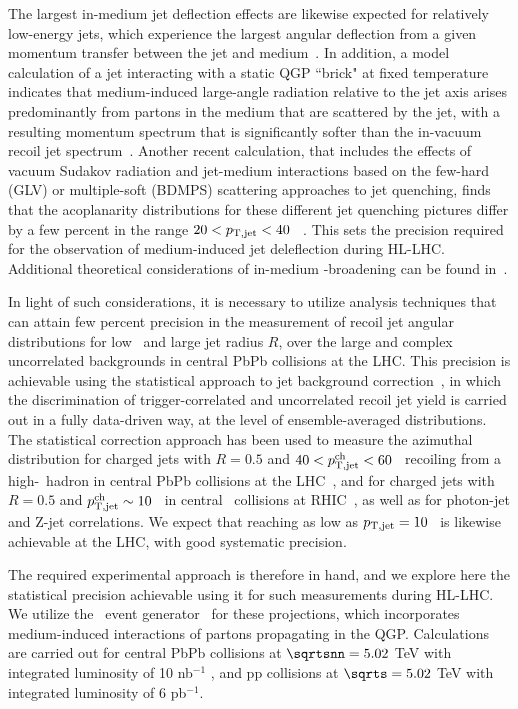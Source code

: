 The largest in-medium jet deflection effects are likewise expected for relatively low-energy jets, which experience the largest angular deflection from a given momentum transfer between the jet and medium~\cite{DEramo:2018eoy,Gyulassy:2018qhr}. In addition, a model calculation of a jet interacting with a static QGP ``brick" at fixed temperature indicates that medium-induced large-angle radiation relative to the jet axis arises predominantly from partons in the medium that are scattered by the jet, with a resulting momentum spectrum that is significantly softer than the in-vacuum recoil jet spectrum~\cite{DEramo:2018eoy}. Another recent calculation, that includes the effects of vacuum Sudakov radiation and jet-medium interactions based on the few-hard (GLV) or multiple-soft (BDMPS) scattering approaches to jet quenching, finds that the acoplanarity distributions for these different jet quenching pictures differ by a few percent in the range $20<p_{\mathrm{T,jet}}<40$ \gevc~\cite{Gyulassy:2018qhr}. This sets the precision required for the observation of medium-induced jet deleflection during HL-LHC. Additional theoretical considerations of in-medium \pT-broadening can be found in~\cite{Zakharov:2018rst,Ghiglieri:2018ltw}.

In light of such considerations, it is necessary to utilize analysis techniques that can attain few percent precision in the measurement of recoil jet angular distributions for low \ptjet\ and large jet radius $R$, over the large and complex uncorrelated backgrounds in central PbPb collisions at the LHC. This precision is achievable using the statistical approach to jet background correction~\cite{Adam:2015doa,Adamczyk:2017yhe,Sirunyan:2017jic,Sirunyan:2017qhf}, in which the discrimination of trigger-correlated and uncorrelated recoil jet yield is carried out in a fully data-driven way, at the level of ensemble-averaged distributions. The statistical correction approach has been used to measure the azimuthal distribution for charged jets with $R=0.5$ and $40<p_{\mathrm{T,jet}}^{\mathrm{ch}}<60$ \gevc\ recoiling from a high-\pt\ hadron in central PbPb collisions at the LHC~\cite{Adam:2015doa}, and for charged jets with $R=0.5$ and $p_{\mathrm{T,jet}}^{\mathrm{ch}}\sim10$ \gevc\ in central \AuAu\ collisions at RHIC~\cite{Adamczyk:2017yhe}, as well as for photon-jet and Z-jet correlations. We expect that reaching as low as $p_{\mathrm{T,jet}}=10$ \gevc\ is likewise achievable at the LHC, with good systematic precision. 

The required experimental approach is therefore in hand, and we explore here the statistical precision achievable using it for such measurements during HL-LHC.
We utilize the \jewel\ event generator~\cite{Zapp:2013vla} for these projections, which incorporates medium-induced interactions of partons propagating in the QGP. Calculations are carried out for central PbPb collisions at $\sqrtsnn=5.02$ TeV with integrated luminosity of 10 nb$^{-1}$ , and pp collisions at $\sqrts=5.02$ TeV with integrated luminosity of 6 pb$^{-1}$.

